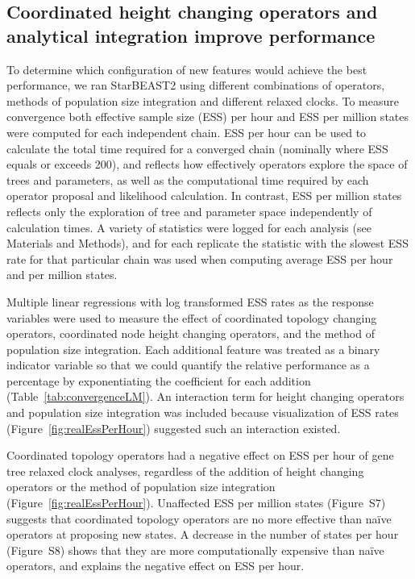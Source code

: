 \documentclass[12pt]{article}
\begin{document}
\subsection{Coordinated height changing operators and analytical integration improve performance}

To determine which configuration of new features would achieve the best
performance, we ran StarBEAST2 using different combinations of operators,
methods of population size integration and different relaxed clocks. To measure
convergence both effective sample size (ESS) per hour and ESS per million states
were computed for each independent chain. ESS per hour can be used to calculate
the total time required for a converged chain (nominally where ESS equals or
exceeds 200), and reflects how effectively operators explore the space of trees
and parameters, as well as the computational time required by each operator proposal
and likelihood calculation. In contrast, ESS per million states reflects only
the exploration of tree and parameter space independently of calculation times.
A variety of statistics were logged for each analysis (see Materials and Methods), and for
each replicate the statistic with the slowest ESS rate for that particular chain
was used when computing average ESS per hour and per million states.

Multiple linear regressions with log transformed ESS rates as the response
variables were used to measure the effect of coordinated topology changing operators,
coordinated node height changing operators, and the method of population size
integration. Each additional feature was treated as a binary indicator variable
so that we could quantify the relative performance as a percentage by
exponentiating the coefficient for each addition
(Table~\ref{tab:convergenceLM}). An interaction term for height changing
operators and population size integration was included because visualization of
ESS rates (Figure~\ref{fig:realEssPerHour}) suggested such an interaction existed.

Coordinated topology operators had a negative effect on ESS per hour of gene
tree relaxed clock analyses, regardless of the addition of height changing
operators or the method of population size integration
(Figure~\ref{fig:realEssPerHour}). Unaffected ESS per million states
(Figure~S7) suggests that coordinated topology operators are no
more effective than na\"ive operators at proposing new states. A decrease in the
number of states per hour (Figure~S8) shows that they are more computationally
expensive than na\"ive operators, and explains the negative effect on ESS per
hour.
\end{document}
